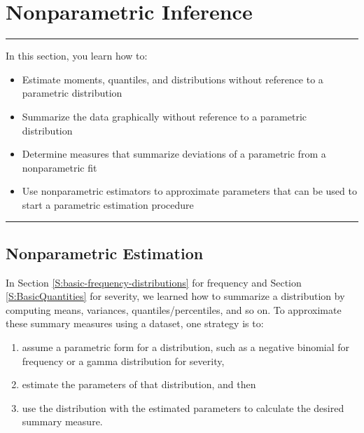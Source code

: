 \documentclass[]{book}
\providecommand{\tightlist}{%
  \setlength{\itemsep}{0pt}\setlength{\parskip}{0pt}}
\theoremstyle{definition}
\theoremstyle{definition}
\theoremstyle{definition}
\theoremstyle{remark}
\begin{document}
\section{Nonparametric Inference}\label{S:MS:NonParInf}

\begin{center}\rule{0.5\linewidth}{\linethickness}\end{center}

In this section, you learn how to:

\begin{itemize}
\tightlist
\item
  Estimate moments, quantiles, and distributions without reference to a
  parametric distribution
\item
  Summarize the data graphically without reference to a parametric
  distribution
\item
  Determine measures that summarize deviations of a parametric from a
  nonparametric fit
\item
  Use nonparametric estimators to approximate parameters that can be
  used to start a parametric estimation procedure
\end{itemize}

\begin{center}\rule{0.5\linewidth}{\linethickness}\end{center}

\subsection{Nonparametric Estimation}\label{nonparametric-estimation}

In Section \ref{S:basic-frequency-distributions} for frequency and
Section \ref{S:BasicQuantities} for severity, we learned how to
summarize a distribution by computing means, variances,
quantiles/percentiles, and so on. To approximate these summary measures
using a dataset, one strategy is to:

\begin{enumerate}
\def\labelenumi{\roman{enumi}.}
\tightlist
\item
  assume a parametric form for a distribution, such as a negative
  binomial for frequency or a gamma distribution for severity,
\item
  estimate the parameters of that distribution, and then
\item
  use the distribution with the estimated parameters to calculate the
  desired summary measure.
\end{enumerate}
\end{document}
